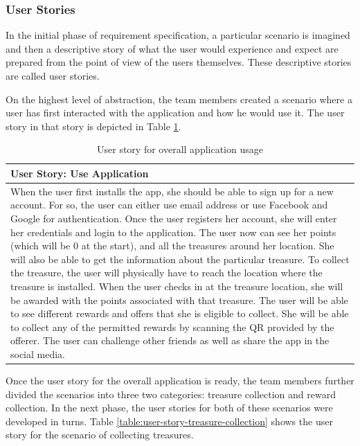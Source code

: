 \documentclass[12pt, a4paper, oneside]{article}
\begin{document}
\subsubsection{User Stories}
In the initial phase of requirement specification, a particular scenario is imagined and then a descriptive story of what the user would experience and expect are prepared from the point of view of the users themselves. These descriptive stories are called user stories.

On the highest level of abstraction, the team members created a scenario where a user has first interacted with the application and how he would use it. The user story in that story is depicted  in Table \ref{table:user-story-use-application}.


\begin{table}[H]
\centering
\begin{tabularx}{\linewidth}{|X|} 
\hline
\textbf{User Story:  Use Application}\\ 
\hline
When the user first installs the app, she should be able to sign up for a new account. For so, the user can either use email address or use Facebook and Google for authentication. Once the user registers her account, she will enter her credentials and login to the application. The user now can see her points (which will be 0 at the start), and all the treasures around her location. She will also be able to get the information about the particular treasure. To collect the treasure, the user will physically have to reach the location where the treasure is installed. When the user checks in at the treasure location, she will be awarded with the points associated with that treasure. The user will be able to see different rewards and offers that she is eligible to collect. She will be able to collect any of the permitted rewards by scanning the QR provided by the offerer. The user can challenge other friends as well as share the app in the social media.\\
\hline
\end{tabularx}
\caption{User story for overall application usage}
\label{table:user-story-use-application}
\end{table}

Once the user story for the overall application is ready, the team members further divided the scenarios into three two categories: treasure collection and reward collection. In the next phase, the user stories for both of these scenarios were developed in turns. Table \ref{table:user-story-treasure-collection} shows the user story for the scenario of collecting treasures.
\end{document}
